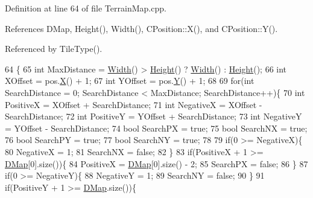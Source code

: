 Definition at line 64 of file Terrain\+Map.\+cpp.



References D\+Map, Height(), Width(), C\+Position\+::\+X(), and C\+Position\+::\+Y().



Referenced by Tile\+Type().


\begin{DoxyCode}
64                                                                               \{
65     \textcolor{keywordtype}{int} MaxDistance = \hyperlink{classCTerrainMap_a34cb754aa9b26e85a73377159f2527d7}{Width}() > \hyperlink{classCTerrainMap_ae5e4bf6507e0e3e9ac0322b43eed8a7a}{Height}() ? \hyperlink{classCTerrainMap_a34cb754aa9b26e85a73377159f2527d7}{Width}() : \hyperlink{classCTerrainMap_ae5e4bf6507e0e3e9ac0322b43eed8a7a}{Height}();
66     \textcolor{keywordtype}{int} XOffset = pos.\hyperlink{classCPosition_a9a6b94d3b91df1492d166d9964c865fc}{X}() + 1;
67     \textcolor{keywordtype}{int} YOffset = pos.\hyperlink{classCPosition_a1aa8a30e2f08dda1f797736ba8c13a87}{Y}() + 1;
68     
69     \textcolor{keywordflow}{for}(\textcolor{keywordtype}{int} SearchDistance = 0; SearchDistance < MaxDistance; SearchDistance++)\{
70         \textcolor{keywordtype}{int} PositiveX = XOffset + SearchDistance;
71         \textcolor{keywordtype}{int} NegativeX = XOffset - SearchDistance;
72         \textcolor{keywordtype}{int} PositiveY = YOffset + SearchDistance;
73         \textcolor{keywordtype}{int} NegativeY = YOffset - SearchDistance;
74         \textcolor{keywordtype}{bool} SearchPX = \textcolor{keyword}{true};
75         \textcolor{keywordtype}{bool} SearchNX = \textcolor{keyword}{true};
76         \textcolor{keywordtype}{bool} SearchPY = \textcolor{keyword}{true};
77         \textcolor{keywordtype}{bool} SearchNY = \textcolor{keyword}{true};
78         
79         \textcolor{keywordflow}{if}(0 >= NegativeX)\{
80             NegativeX = 1;   
81             SearchNX = \textcolor{keyword}{false};
82         \}
83         \textcolor{keywordflow}{if}(PositiveX + 1 >= \hyperlink{classCTerrainMap_a80d154ce478948b10473534a7bca13f6}{DMap}[0].size())\{
84             PositiveX = \hyperlink{classCTerrainMap_a80d154ce478948b10473534a7bca13f6}{DMap}[0].size() - 2;
85             SearchPX = \textcolor{keyword}{false};
86         \}
87         \textcolor{keywordflow}{if}(0 >= NegativeY)\{
88             NegativeY = 1;
89             SearchNY = \textcolor{keyword}{false};
90         \}
91         \textcolor{keywordflow}{if}(PositiveY + 1 >= \hyperlink{classCTerrainMap_a80d154ce478948b10473534a7bca13f6}{DMap}.size())\{

\end{DoxyCode}
